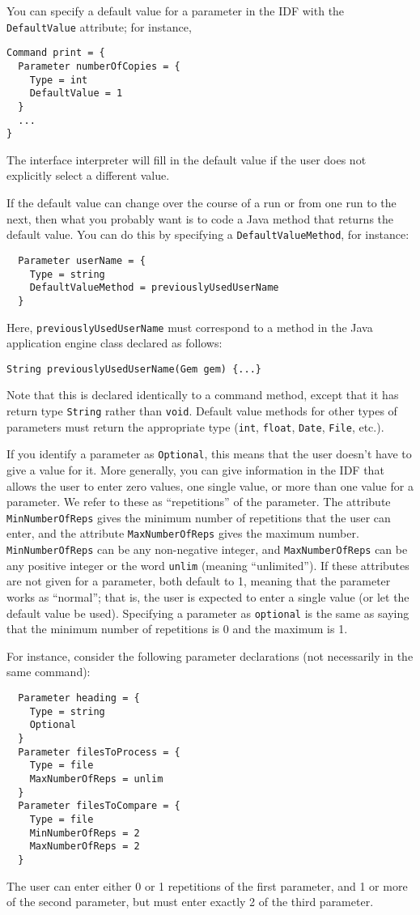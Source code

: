 \documentclass[11pt]{report}
\begin{document}
You can specify a default value for a parameter in the IDF with
the {\tt DefaultValue} attribute; for instance,
\begin{verbatim}
Command print = {
  Parameter numberOfCopies = {
    Type = int
    DefaultValue = 1
  }
  ...
}
\end{verbatim}
The interface interpreter will fill in the default value if the
user does not explicitly select a different value.

If the default value can change over the course of a run or from
one run to the next, then what you probably want is to code a
Java method that returns the default value.  You can do this
by specifying a {\tt DefaultValueMethod}, for instance:
\begin{verbatim}
  Parameter userName = {
    Type = string
    DefaultValueMethod = previouslyUsedUserName
  }
\end{verbatim}
Here, {\tt previouslyUsedUserName} must correspond to a method in
the Java application engine class declared as follows:
\begin{verbatim}
String previouslyUsedUserName(Gem gem) {...}
\end{verbatim}
Note that this is declared identically to a command method, except
that it has return type {\tt String} rather than {\tt void}.
Default value methods for other types of parameters must return
the appropriate type ({\tt int}, {\tt float}, {\tt Date}, {\tt File}, etc.).

If you identify a parameter as {\tt Optional}, this means that
the user doesn't have to give a value for it.  More generally,
you can give information in the IDF that allows the user to
enter zero values, one single value, or more than one value for a parameter.
We refer to these as ``repetitions'' of the parameter.
The attribute {\tt MinNumberOfReps} gives the minimum number of
repetitions that the user can enter, and 
the attribute {\tt MaxNumberOfReps} gives the maximum number.
{\tt MinNumberOfReps} can be any non-negative integer, and
{\tt MaxNumberOfReps} can be any positive integer or the word
{\tt unlim} (meaning ``unlimited'').  If these attributes are
not given for a parameter,
both default to 1, meaning that the parameter works as ``normal'';
that is, the user is expected to enter a single value (or let the
default value be used).
Specifying a parameter as {\tt optional} is
the same  as saying that the minimum number of repetitions is 0
and the maximum is 1.

For instance, consider the following parameter declarations (not
necessarily in the same command):
\begin{verbatim}
  Parameter heading = {
    Type = string
    Optional
  }
  Parameter filesToProcess = {
    Type = file
    MaxNumberOfReps = unlim
  }
  Parameter filesToCompare = {
    Type = file
    MinNumberOfReps = 2
    MaxNumberOfReps = 2
  }
\end{verbatim}
The user can enter either 0 or 1 repetitions of the first parameter,
and 1 or more of the second parameter, but must enter exactly
2 of the third parameter.
\end{document}
